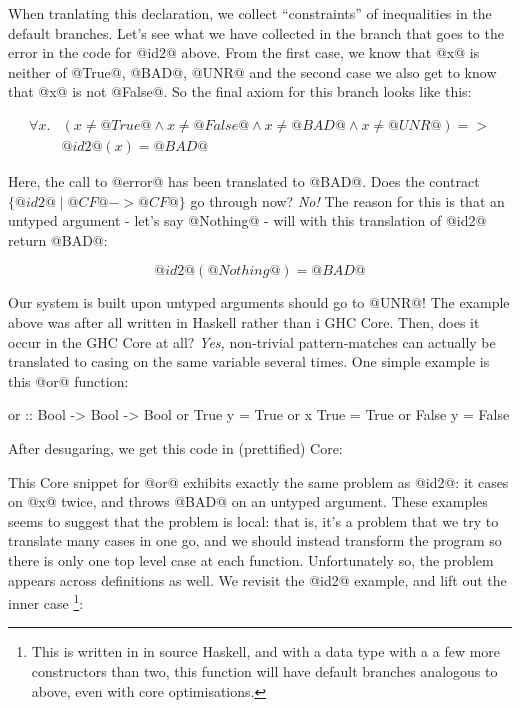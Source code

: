 When tranlating this declaration, we collect ``constraints'' of
inequalities in the default branches. Let's see what we have collected
in the branch that goes to the error in the code for @id2@ above.
From the first case, we know that @x@ is neither of @True@, @BAD@,
@UNR@ and the second case we also get to know that @x@ is not
@False@. So the final axiom for this branch looks like this:

\[\begin{array}{rl}
\forall x . &
    (x \neq @True@ \land
     x \neq @False@ \land
     x \neq @BAD@ \land
     x \neq @UNR@) =>  \\ & @id2@(x) = @BAD@
\end{array}\]

Here, the call to @error@ has been translated to @BAD@. Does the
contract $\{ @id2@ \mid @CF@ -> @CF@ \}$ go through now? \emph{No!}
The reason for this is that an untyped argument - let's say @Nothing@ -
will with this translation of @id2@ return @BAD@:

$$@id2@(@Nothing@) = @BAD@$$

Our system is built upon untyped arguments should go to @UNR@!  The
example above was after all written in Haskell rather than i GHC Core.
Then, does it occur in the GHC Core at all? \emph{Yes,} non-trivial
pattern-matches can actually be translated to casing on the same
variable several times. One simple example is this @or@ function:

\begin{code}
    or :: Bool -> Bool -> Bool
    or True  y    = True
    or x     True = True
    or False y    = False
\end{code}

After desugaring, we get this code in (prettified) Core:

\begin{code}
or :: Bool -> Bool -> Ok
or = \ (x :: Bool) (y :: Bool) ->
    case x of {
        True -> True
        _ -> case y of {
            True -> True
            _ -> case x of {
                False -> False
                _ -> patError "function or"
\end{code}

This Core snippet for @or@ exhibits exactly the same problem as @id2@:
it cases on @x@ twice, and throws @BAD@ on an untyped argument.  These
examples seems to suggest that the problem is local: that is, it's a
problem that we try to translate many cases in one go, and we should
instead transform the program so there is only one top level case at
each function. Unfortunately so, the problem appears across
definitions as well. We revisit the @id2@ example, and lift out the
inner case
\footnote{This is written in in source Haskell, and with a data type
  with a a few more constructors than two, this function will have
  default branches analogous to above, even with core optimisations.
}:

